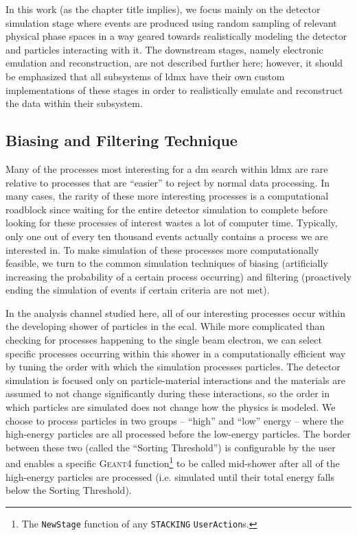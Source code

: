 In this work (as the chapter title implies), we focus mainly on the detector simulation stage where
events are produced using random sampling of relevant physical phase spaces in a way geared towards
realistically modeling the detector and particles interacting with it. The downstream stages,
namely electronic emulation and reconstruction, are not described further here; however, it should
be emphasized that all subsystems of \ac{ldmx} have their own custom implementations of these
stages in order to realistically emulate and reconstruct the data within their subsystem.

\subsection{Biasing and Filtering Technique} \label{sec:bias-and-filter}
Many of the processes most interesting for a \ac{dm} search within \ac{ldmx} are rare relative to
processes that are ``easier'' to reject by normal data processing.
In many cases, the rarity of these more interesting processes is a computational roadblock
since waiting for the entire detector simulation to complete before looking for these processes
of interest wastes a lot of computer time.
Typically, only one out of every ten thousand events actually contains a process we are interested in.
To make simulation of these processes more computationally feasible, we turn to the common simulation
techniques of biasing (artificially increasing the probability of a certain process occurring) and
filtering (proactively ending the simulation of events if certain criteria are not met).

In the analysis channel studied here, all of our interesting processes occur within the developing
shower of particles in the \ac{ecal}.
While more complicated than checking for processes happening to the single beam electron,
we can select specific processes occurring within this shower in a computationally
efficient way by tuning the order with which the simulation processes particles.
The detector simulation is focused only on particle-material interactions
and the materials are assumed to not change significantly during these interactions, so the order 
in which particles are simulated does not change how the physics is modeled.
We choose to process particles in two groups -- ``high'' and ``low'' energy --
where the high-energy particles are all processed before the low-energy particles.
The border between these two (called the ``Sorting Threshold'') is configurable by the user and
enables a specific \textsc{Geant4} function\footnote{
The \texttt{NewStage} function of any \texttt{STACKING} \texttt{UserAction}s. 
} to be called mid-shower after all of the high-energy particles are processed
(i.e. simulated until their total energy falls below the Sorting Threshold).

